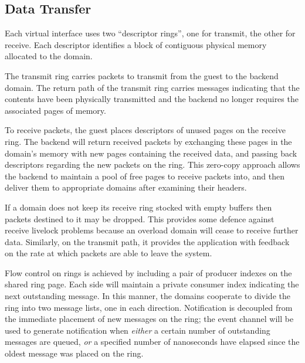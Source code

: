 \documentclass[11pt,twoside,final,openright]{xenstyle}
\begin{document}
\subsection{Data Transfer}

Each virtual interface uses two ``descriptor rings'', one for transmit,
the other for receive.  Each descriptor identifies a block of contiguous
physical memory allocated to the domain.  

The transmit ring carries packets to transmit from the guest to the
backend domain.  The return path of the transmit ring carries messages
indicating that the contents have been physically transmitted and the
backend no longer requires the associated pages of memory.

To receive packets, the guest places descriptors of unused pages on
the receive ring.  The backend will return received packets by
exchanging these pages in the domain's memory with new pages
containing the received data, and passing back descriptors regarding
the new packets on the ring.  This zero-copy approach allows the
backend to maintain a pool of free pages to receive packets into, and
then deliver them to appropriate domains after examining their
headers.

%

If a domain does not keep its receive ring stocked with empty buffers then 
packets destined to it may be dropped.  This provides some defence against 
receive livelock problems because an overload domain will cease to receive
further data.  Similarly, on the transmit path, it provides the application
with feedback on the rate at which packets are able to leave the system.


Flow control on rings is achieved by including a pair of producer
indexes on the shared ring page.  Each side will maintain a private
consumer index indicating the next outstanding message.  In this
manner, the domains cooperate to divide the ring into two message
lists, one in each direction.  Notification is decoupled from the
immediate placement of new messages on the ring; the event channel
will be used to generate notification when {\em either} a certain
number of outstanding messages are queued, {\em or} a specified number
of nanoseconds have elapsed since the oldest message was placed on the
ring.

\end{document}
